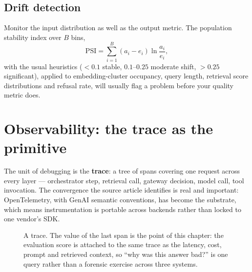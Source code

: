 \documentclass[11pt,twoside,openright]{book}
\theoremstyle{definition}
\theoremstyle{plain}
\theoremstyle{remark}
\newcommand{\term}[1]{\textbf{#1}}
\begin{document}
\subsection{Drift detection}

Monitor the input distribution as well as the output metric. The population
stability index over $B$ bins,
\begin{equation}
  \mathrm{PSI} = \sum_{i=1}^{B} (a_i - e_i)\ln\frac{a_i}{e_i},
\end{equation}
with the usual heuristics ($<0.1$ stable, $0.1$--$0.25$ moderate shift, $>0.25$
significant), applied to embedding-cluster occupancy, query length, retrieval
score distributions and refusal rate, will usually flag a problem before your
quality metric does.

\section{Observability: the trace as the primitive}

The unit of debugging is the \term{trace}: a tree of spans covering one request
across every layer --- orchestrator step, retrieval call, gateway decision,
model call, tool invocation. The convergence the source article identifies is
real and important: OpenTelemetry, with GenAI semantic conventions, has become
the substrate, which means instrumentation is portable across backends rather
than locked to one vendor's SDK.

\begin{figure}[H]
\centering
{}
\caption{A trace. The value of the last span is the point of this chapter:
the evaluation score is attached to the same trace as the latency, cost, prompt
and retrieved context, so ``why was this answer bad?'' is one query rather than
a forensic exercise across three systems.}
\label{fig:trace}
\end{figure}
\end{document}
